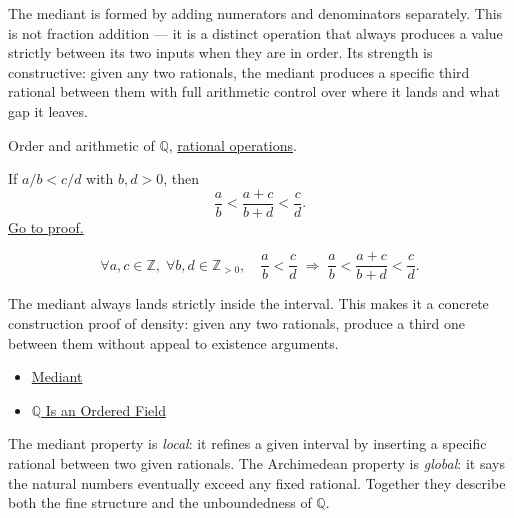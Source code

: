 \begin{remark*}[Interpretation]
The mediant is formed by adding numerators and denominators separately.
This is not fraction addition — it is a distinct operation that always
produces a value strictly between its two inputs when they are in order.
Its strength is constructive: given any two rationals, the mediant produces
a specific third rational between them with full arithmetic control over
where it lands and what gap it leaves.
\end{remark*}

\begin{remark*}[Dependencies]
Order and arithmetic of $\mathbb{Q}$,
\hyperref[def:rational-operations]{rational operations}.
\end{remark*}

\begin{theorem}
\label{thm:mediant-inequality}
If $a/b < c/d$ with $b, d > 0$, then
\[
\frac{a}{b} < \frac{a+c}{b+d} < \frac{c}{d}.
\]
\hyperref[prf:mediant-inequality]{Go to proof.}
\end{theorem}

\begin{remark*}
\[
\forall a,c \in \mathbb{Z},\; \forall b,d \in \mathbb{Z}_{>0},\quad
\frac{a}{b} < \frac{c}{d}
\;\Longrightarrow\;
\frac{a}{b} < \frac{a+c}{b+d} < \frac{c}{d}.
\]
\end{remark*}

\begin{remark*}[Interpretation]
The mediant always lands strictly inside the interval.  This makes it a
concrete construction proof of density: given any two rationals, produce
a third one between them without appeal to existence arguments.
\end{remark*}

\begin{remark*}[Dependencies]
\begin{itemize}
  \item \hyperref[def:mediant]{Mediant}
  \item \hyperref[thm:q-is-ordered-field]{$\mathbb{Q}$ Is an Ordered Field}
\end{itemize}
\end{remark*}

\begin{remark*}
\label{rem:mediant-vs-arch}
The mediant property is \emph{local}: it refines a given interval by
inserting a specific rational between two given rationals.
The Archimedean property is \emph{global}: it says the natural numbers
eventually exceed any fixed rational.
Together they describe both the fine structure and the unboundedness of
$\mathbb{Q}$.
\end{remark*}

